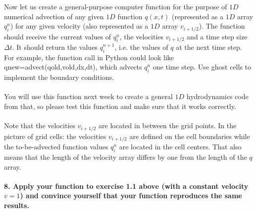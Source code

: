 Now let us create a general-purpose computer function for 
the purpose of $1D$ numerical advection of any given $1D$ 
function $q(x, t)$ (represented as a $1D$ array $q^n_i$) 
for any given velocity (also represented as a $1D$ array 
$v_{i+1/2}$). The function should receive the current
values of $q^n_i$, the velocities $v_{i+1/2}$ and a time 
step size $\Delta t$. It should return the values 
$q^{n+1}_i$, i.e. the values of $q$ at the next time step. 
For example, the function call in Python could look like 
qnew=advect(qold,vold,dx,dt), which advects $q^n_i$ one 
time step. Use ghost cells to implement the boundary 
conditions. \\
\\
You will use this function next week to create 
a general $1D$ hydrodynamics code from that, so please test 
this function and make sure that it works correctly. \\
\\
Note that the velocities $v_{i+1/2}$ are located in between 
the grid points. In the picture of grid cells: the 
velocities $v_{i+1/2}$ are defined on the cell boundaries 
while the to-be-advected function values $q^n_i$ are 
located in the cell centers. That also means that the 
length of the velocity array differs by one from the 
length of the $q$ array.

\paragraph{8. Apply your function to exercise 1.1 above 
    (with a constant velocity $v=1$) and convince yourself 
    that your function reproduces the same results.
} \ \\
    \\
    


